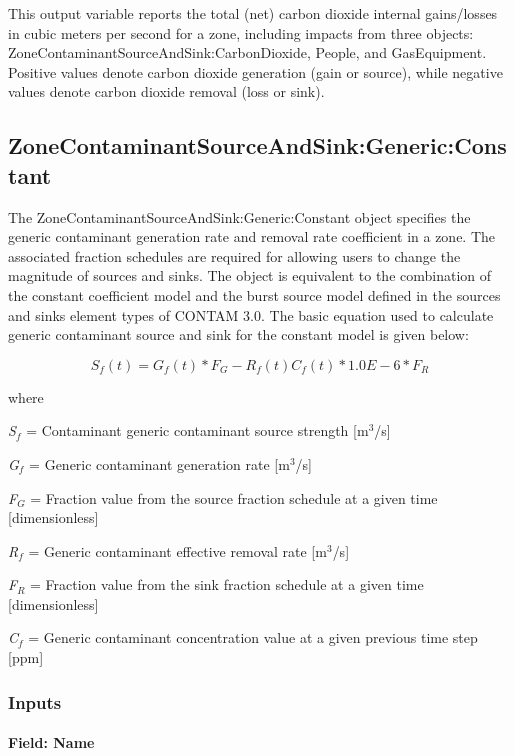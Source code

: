This output variable reports the total (net) carbon dioxide internal gains/losses in cubic meters per second for a zone, including impacts from three objects: ZoneContaminantSourceAndSink:CarbonDioxide, People, and GasEquipment. Positive values denote carbon dioxide generation (gain or source), while negative values denote carbon dioxide removal (loss or sink).

\subsection{ZoneContaminantSourceAndSink:Generic:Constant}\label{zonecontaminantsourceandsinkgenericconstant}

The ZoneContaminantSourceAndSink:Generic:Constant object specifies the generic contaminant generation rate and removal rate coefficient in a zone. The associated fraction schedules are required for allowing users to change the magnitude of sources and sinks. The object is equivalent to the combination of the constant coefficient model and the burst source model defined in the sources and sinks element types of CONTAM 3.0. The basic equation used to calculate generic contaminant source and sink for the constant model is given below:

\begin{equation}
{S_f}(t) = {G_f}(t)*{F_G} - {R_f}(t){C_f}(t)*1.0E - 6*{F_R}
\end{equation}

where

\emph{S\(_{f}\)} = Contaminant generic contaminant source strength {[}m\(^{3}\)/s{]}

\emph{G\(_{f}\)} = Generic contaminant generation rate {[}m\(^{3}\)/s{]}

\emph{F\(_{G}\)} = Fraction value from the source fraction schedule at a given time {[}dimensionless{]}

\emph{R\(_{f}\)} = Generic contaminant effective removal rate {[}m\(^{3}\)/s{]}

\emph{F\(_{R}\)} = Fraction value from the sink fraction schedule at a given time {[}dimensionless{]}

\emph{C\(_{f}\)} = Generic contaminant concentration value at a given previous time step {[}ppm{]}

\subsubsection{Inputs}\label{inputs-11-007}

\paragraph{Field: Name}\label{field-name-11-006}

